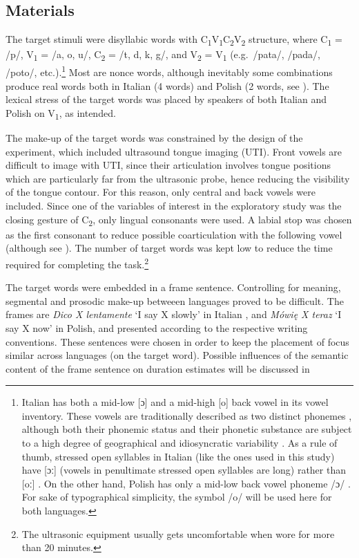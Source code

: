 \documentclass[12pt,]{article}
\let\rmarkdownfootnote\footnote%
\def\footnote{\protect\rmarkdownfootnote}
\begin{document}
\hypertarget{materials}{%
\subsection{Materials}\label{materials}}

\label{s:materials}

The target stimuli were disyllabic words with
C\textsubscript{1}V\textsubscript{1}C\textsubscript{2}V\textsubscript{2}
structure, where C\textsubscript{1} = /p/, V\textsubscript{1} = /a, o,
u/, C\textsubscript{2} = /t, d, k, g/, and V\textsubscript{2} =
V\textsubscript{1} (e.g.~/pata/, /pada/, /poto/,
etc.).\footnote{Italian has both a mid-low [ɔ] and a mid-high [o] back vowel in its vowel inventory. These vowels are traditionally described as two distinct phonemes \citep{kramer2009}, although both their phonemic status and their phonetic substance are subject to a high degree of geographical and idiosyncratic variability \citep{renwick2016}. As a rule of thumb, stressed open syllables in Italian (like the ones used in this study) have [ɔː] (vowels in penultimate stressed open syllables are long) rather than [oː] \citep{renwick2016}. On the other hand, Polish has only a mid-low back vowel phoneme /ɔ/ \citep{gussmann2007}. For sake of typographical simplicity, the symbol /o/ will be used here for both languages.}
Most are nonce words, although inevitably some combinations produce real
words both in Italian (4 words) and Polish (2 words, see
). The lexical stress of the target words was placed by
speakers of both Italian and Polish on V\textsubscript{1}, as intended.

The make-up of the target words was constrained by the design of the
experiment, which included ultrasound tongue imaging (UTI). Front vowels
are difficult to image with UTI, since their articulation involves
tongue positions which are particularly far from the ultrasonic probe,
hence reducing the visibility of the tongue contour. For this reason,
only central and back vowels were included. Since one of the variables
of interest in the exploratory study was the closing gesture of
C\textsubscript{2}, only lingual consonants were used. A labial stop was
chosen as the first consonant to reduce possible coarticulation with the
following vowel (although see \citealt{vazquez-alvarez2007}). The number
of target words was kept low to reduce the time required for completing
the
task.\footnote{The ultrasonic equipment usually gets uncomfortable when wore for more than 20 minutes.
}

The target words were embedded in a frame sentence. Controlling for
meaning, segmental and prosodic make-up betweeen languages proved to be
difficult. The frames are \emph{Dico X lentamente} `I say X slowly' in
Italian \citep[following][]{hajek2008}, and \emph{Mówię X teraz} `I say
X now' in Polish, and presented according to the respective writing
conventions. These sentences were chosen in order to keep the placement
of focus similar across languages (on the target word). Possible
influences of the semantic content of the frame sentence on duration
estimates will be discussed in 
\end{document}
